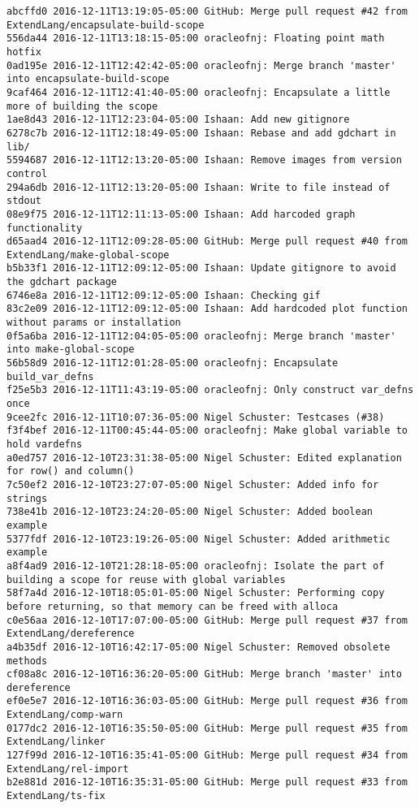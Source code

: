 \begin{lstlisting}
abcffd0 2016-12-11T13:19:05-05:00 GitHub: Merge pull request #42 from ExtendLang/encapsulate-build-scope
556da44 2016-12-11T13:18:15-05:00 oracleofnj: Floating point math hotfix
0ad195e 2016-12-11T12:42:42-05:00 oracleofnj: Merge branch 'master' into encapsulate-build-scope
9caf464 2016-12-11T12:41:40-05:00 oracleofnj: Encapsulate a little more of building the scope
1ae8d43 2016-12-11T12:23:04-05:00 Ishaan: Add new gitignore
6278c7b 2016-12-11T12:18:49-05:00 Ishaan: Rebase and add gdchart in lib/
5594687 2016-12-11T12:13:20-05:00 Ishaan: Remove images from version control
294a6db 2016-12-11T12:13:20-05:00 Ishaan: Write to file instead of stdout
08e9f75 2016-12-11T12:11:13-05:00 Ishaan: Add harcoded graph functionality
d65aad4 2016-12-11T12:09:28-05:00 GitHub: Merge pull request #40 from ExtendLang/make-global-scope
b5b33f1 2016-12-11T12:09:12-05:00 Ishaan: Update gitignore to avoid the gdchart package
6746e8a 2016-12-11T12:09:12-05:00 Ishaan: Checking gif
83c2e09 2016-12-11T12:09:12-05:00 Ishaan: Add hardcoded plot function without params or installation
0f5a6ba 2016-12-11T12:04:05-05:00 oracleofnj: Merge branch 'master' into make-global-scope
56b58d9 2016-12-11T12:01:28-05:00 oracleofnj: Encapsulate build_var_defns
f25e5b3 2016-12-11T11:43:19-05:00 oracleofnj: Only construct var_defns once
9cee2fc 2016-12-11T10:07:36-05:00 Nigel Schuster: Testcases (#38)
f3f4bef 2016-12-11T00:45:44-05:00 oracleofnj: Make global variable to hold vardefns
a0ed757 2016-12-10T23:31:38-05:00 Nigel Schuster: Edited explanation for row() and column()
7c50ef2 2016-12-10T23:27:07-05:00 Nigel Schuster: Added info for strings
738e41b 2016-12-10T23:24:20-05:00 Nigel Schuster: Added boolean example
5377fdf 2016-12-10T23:19:26-05:00 Nigel Schuster: Added arithmetic example
a8f4ad9 2016-12-10T21:28:18-05:00 oracleofnj: Isolate the part of building a scope for reuse with global variables
58f7a4d 2016-12-10T18:05:01-05:00 Nigel Schuster: Performing copy before returning, so that memory can be freed with alloca
c0e56aa 2016-12-10T17:07:00-05:00 GitHub: Merge pull request #37 from ExtendLang/dereference
a4b35df 2016-12-10T16:42:17-05:00 Nigel Schuster: Removed obsolete methods
cf08a8c 2016-12-10T16:36:20-05:00 GitHub: Merge branch 'master' into dereference
ef0e5e7 2016-12-10T16:36:03-05:00 GitHub: Merge pull request #36 from ExtendLang/comp-warn
0177dc2 2016-12-10T16:35:50-05:00 GitHub: Merge pull request #35 from ExtendLang/linker
127f99d 2016-12-10T16:35:41-05:00 GitHub: Merge pull request #34 from ExtendLang/rel-import
b2e881d 2016-12-10T16:35:31-05:00 GitHub: Merge pull request #33 from ExtendLang/ts-fix

\end{lstlisting}
